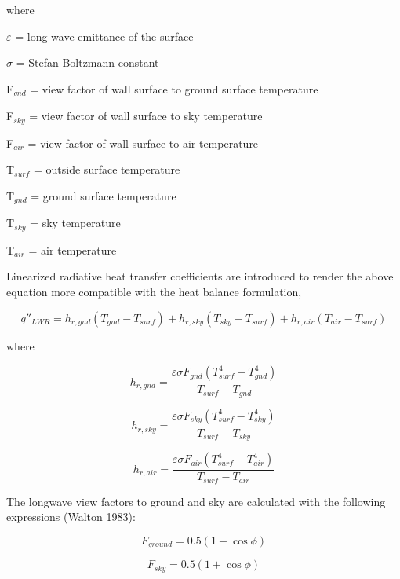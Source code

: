 where

$\varepsilon$ = long-wave emittance of the surface

$\sigma$ = Stefan-Boltzmann constant

F\(_{gnd}\) = view factor of wall surface to ground surface temperature

F\(_{sky}\) = view factor of wall surface to sky temperature

F\(_{air}\) = view factor of wall surface to air temperature

T\(_{surf}\) = outside surface temperature

T\(_{gnd}\) = ground surface temperature

T\(_{sky}\) = sky temperature

T\(_{air}\) = air temperature

Linearized radiative heat transfer coefficients are introduced to render the above equation more compatible with the heat balance formulation,

\begin{equation}
{q''_{LWR}} = {h_{r,gnd}}({T_{gnd}} - {T_{surf}}) + {h_{r,sky}}({T_{sky}} - {T_{surf}}) + {h_{r,air}}({T_{air}} - {T_{surf}})
\end{equation}

where

\begin{equation}
{h_{r,gnd}} = \frac{{\varepsilon \sigma {F_{gnd}}(T_{surf}^4 - T_{gnd}^4)}}{{{T_{surf}} - {T_{gnd}}}}
\end{equation}

\begin{equation}
{h_{r,sky}} = \frac{{\varepsilon \sigma {F_{sky}}(T_{surf}^4 - T_{sky}^4)}}{{{T_{surf}} - {T_{sky}}}}
\end{equation}

\begin{equation}
{h_{r,air}} = \frac{{\varepsilon \sigma {F_{air}}(T_{surf}^4 - T_{air}^4)}}{{{T_{surf}} - {T_{air}}}}
\end{equation}

The longwave view factors to ground and sky are calculated with the following expressions (Walton 1983):

\begin{equation}
{F_{ground}} = 0.5(1 - \cos \phi )
\end{equation}

\begin{equation}
{F_{sky}} = 0.5(1 + \cos \phi )
\end{equation}

